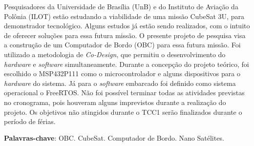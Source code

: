 \begin{resumo}
Pesquisadores da Universidade de Brasília (UnB) e do Instituto de Aviação da Polônia (ILOT) estão estudando a viabilidade de uma missão CubeSat 3U, para demonstrador tecnológico. Alguns estudos já estão sendo realizados, com o intuito de oferecer soluções para essa futura missão. O presente projeto de pesquisa visa a construção de um Computador de Bordo (OBC) para essa futura missão. Foi utilizado a metodologia de \textit{Co-Design}, que permitiu o desenvolvimento do \textit{hardware} e \textit{software} simultaneamente. Durante a concepção do projeto teórico, foi escolhido o MSP432P111 como o microcontrolador e alguns dispositivos para o \textit{hardware} do sistema. Já para o \textit{software} embarcado foi definido como sistema operacional o FreeRTOS. Não foi possível terminar todas as atividades previstas no cronograma, pois houveram alguns imprevistos durante a realização do projeto. Os objetivos não atingidos durante o TCC1 serão finalizados durante o período de férias.

 \vspace{\onelineskip}
    
 \noindent
 \textbf{Palavras-chave}: OBC. CubeSat. Computador de Bordo. Nano Satélites.

\end{resumo}
